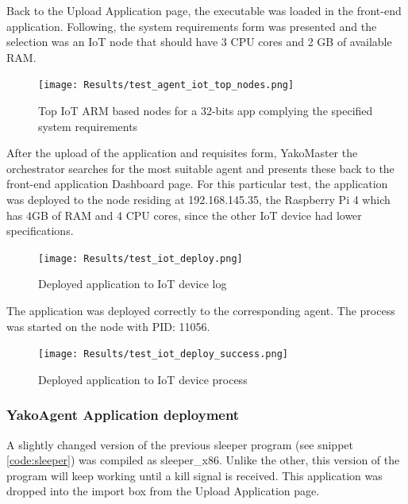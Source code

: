             Back to the Upload Application page, the executable was loaded in the front-end application. Following, the system requirements form was presented and the selection was an IoT node that should have 3 CPU cores and 2 GB of available RAM.
            
            \begin{figure}[H]
                \centering
                \texttt{[image: Results/test\_agent\_iot\_top\_nodes.png]}
                \caption{Top IoT ARM based nodes for a 32-bits app complying the specified system requirements}
                \label{fig:test_agent_iot_top_nodes}
            \end{figure}
            
            After the upload of the application and requisites form, YakoMaster the orchestrator searches for the most suitable agent and presents these back to the front-end application Dashboard page. For this particular test, the application was deployed to the node residing at 192.168.145.35, the Raspberry Pi 4 which has 4GB of RAM and 4 CPU cores, since the other IoT device had lower specifications.
            
            \begin{figure}[H]
                \centering
                \texttt{[image: Results/test\_iot\_deploy.png]}
                \caption{Deployed application to IoT device log}
                \label{fig:test_iot_deploy}
            \end{figure}
            
            The application was deployed correctly to the corresponding agent. The process was started on the node with PID: 11056.
            
            \begin{figure}[H]
                \centering
                \texttt{[image: Results/test\_iot\_deploy\_success.png]}
                \caption{Deployed application to IoT device process}
                \label{fig:test_iot_deploy_success}
            \end{figure}
        
        \subsubsection{YakoAgent Application deployment}
            A slightly changed version of the previous sleeper program (see snippet \ref{code:sleeper}) was compiled as sleeper\_x86. Unlike the other, this version of the program will keep working until a kill signal is received. This application was dropped into the import box from the Upload Application page.
            
